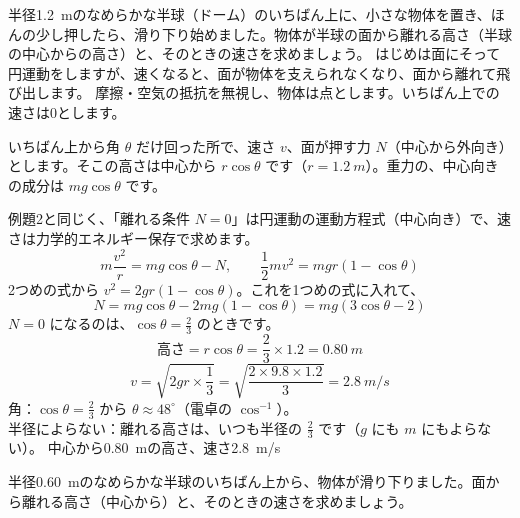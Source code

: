 \label{ph:力-4:ex15}
\begin{phreidai}[半球の上を滑り下りる]
半径\qty{1.2}{m}のなめらかな半球（ドーム）のいちばん上に、小さな物体を置き、ほんの少し押したら、滑り下り始めました。物体が半球の面から離れる高さ（半球の中心からの高さ）と、そのときの速さを求めましょう。
\phbamen
はじめは面にそって円運動をしますが、速くなると、面が物体を支えられなくなり、面から離れて飛び出します。
\phmushi
摩擦・空気の抵抗を無視し、物体は点とします。いちばん上での速さは0とします。
\phzu
\noindent\begin{minipage}[c]{0.4\linewidth}\centering
{}
\end{minipage}\hfill
\begin{minipage}[c]{0.57\linewidth}\raggedright
いちばん上から角 $\theta$ だけ回った所で、速さ $v$、面が押す力 $N$（中心から外向き）とします。そこの高さは中心から $r\cos\theta$ です（$r=\qty{1.2}{m}$）。重力の、中心向きの成分は $mg\cos\theta$ です。
\end{minipage}
\phriyu
例題2と同じく、「離れる条件 $N=0$」は円運動の運動方程式（中心向き）で、速さは力学的エネルギー保存で求めます。
\phtateru
\[m\frac{v^2}{r}=mg\cos\theta-N,\qquad \frac{1}{2}mv^2=mgr(1-\cos\theta)\]
\phtoku
2つめの式から $v^2=2gr(1-\cos\theta)$。これを1つめの式に入れて、
\[N=mg\cos\theta-2mg(1-\cos\theta)=mg(3\cos\theta-2)\]
$N=0$ になるのは、$\cos\theta=\tfrac{2}{3}$ のときです。
\[\text{高さ}=r\cos\theta=\frac{2}{3}\times1.2=\qty{0.80}{m}\]
\[v=\sqrt{2gr\times\frac{1}{3}}=\sqrt{\frac{2\times9.8\times1.2}{3}}=\qty{2.8}{m/s}\]
\phtashikame
角：$\cos\theta=\tfrac{2}{3}$ から $\theta\approx48^\circ$（電卓の $\cos^{-1}$）。\\
半径によらない：離れる高さは、いつも半径の $\tfrac{2}{3}$ です（$g$ にも $m$ にもよらない）。
\kotae 中心から\qty{0.80}{m}の高さ、速さ\qty{2.8}{m/s}
\end{phreidai}
\begin{jibun}
半径\qty{0.60}{m}のなめらかな半球のいちばん上から、物体が滑り下りました。面から離れる高さ（中心から）と、そのときの速さを求めましょう。
\end{jibun}

